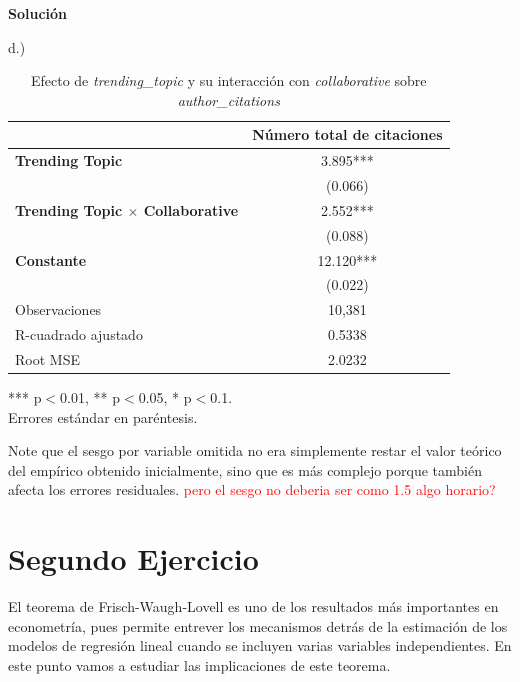 \documentclass[a4paper, answers, addpoints, 11pt]{exam}
\newenvironment{solucion}{%
  \begin{mdframed}[
    backgroundcolor=blue!5,    %
    linecolor=blue!50,          %
    linewidth=2pt,              %
    leftmargin=10pt,            %
    rightmargin=10pt,           %
    topline=true,              %
    bottomline=true,            %
    roundcorner=10pt,           %
    innerleftmargin=10pt,       %
    innerrightmargin=10pt,      %
    innerbottommargin=10pt,     %
    innertopmargin=10pt         %
  ]%
  \begin{tcolorbox}[colframe=blue!50!black, colback=blue!50, coltitle=white, sharp corners=all, boxrule=1mm, width=\textwidth, halign=left, valign=center, top=0mm, bottom=0mm, left=0mm, right=0mm] \textbf{Solución} \end{tcolorbox} }{\end{mdframed}}
\begin{document}
\begin{itemize}
\begin{solucion}
        d.)
        \begin{table}[H]
    \centering
    \caption{Efecto de \textit{trending\_topic} y su interacción con \textit{collaborative} sobre \textit{author\_citations}}
    \label{tab:resultados}
    \begin{tabular}{l c}
        \toprule
        & Número total de citaciones \\
        \midrule
        \textbf{Trending Topic} & 3.895*** \\
        & (0.066) \\
        \textbf{Trending Topic $\times$ Collaborative} & 2.552*** \\
        & (0.088) \\
        \textbf{Constante} & 12.120*** \\
        & (0.022) \\
        \midrule
        Observaciones & 10,381 \\
        R-cuadrado ajustado & 0.5338 \\
        Root MSE & 2.0232 \\
        \bottomrule
    \end{tabular}
    
    \vspace{0.3cm}
    \footnotesize{*** p$<$0.01, ** p$<$0.05, * p$<$0.1. \\
    Errores estándar en paréntesis.}
\end{table}
Note que el sesgo por variable omitida no era simplemente restar el valor teórico del empírico obtenido inicialmente, sino que es más complejo porque también afecta los errores residuales.
\textcolor{red}{pero el sesgo no deberia ser como 1.5 algo horario?}
        
        \end{solucion}
    

\end{itemize}
\bigskip



\section*{Segundo Ejercicio}
El teorema de Frisch-Waugh-Lovell es uno de los resultados más importantes en econometría, pues permite entrever los mecanismos detrás de la estimación de los modelos de regresión lineal cuando se incluyen varias variables independientes. En este punto vamos a estudiar las implicaciones de este teorema.
\end{document}
